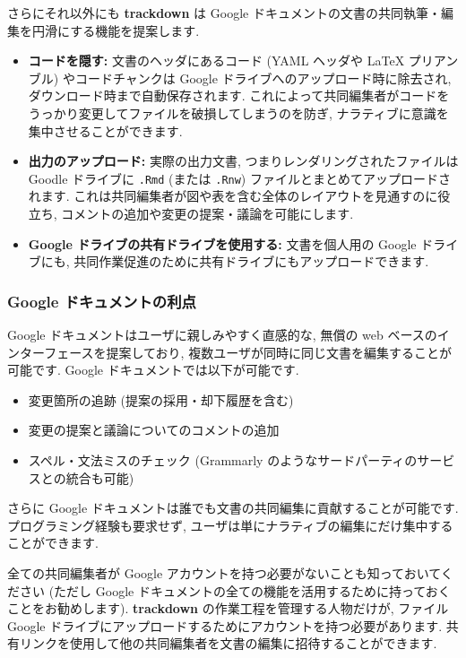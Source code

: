 \documentclass[
  11pt,
  lualatex,ja=standard,jafont=noto]{bxjsreport}
\providecommand{\tightlist}{%
  \setlength{\itemsep}{0pt}\setlength{\parskip}{0pt}}
\begin{document}
さらにそれ以外にも \textbf{trackdown} は Google ドキュメントの文書の共同執筆・編集を円滑にする機能を提案します.

\begin{itemize}
\item
  \textbf{コードを隠す:} 文書のヘッダにあるコード (YAML ヘッダや LaTeX プリアンブル) やコードチャンクは Google ドライブへのアップロード時に除去され, ダウンロード時まで自動保存されます. これによって共同編集者がコードをうっかり変更してファイルを破損してしまうのを防ぎ, ナラティブに意識を集中させることができます.
\item
  \textbf{出力のアップロード:} 実際の出力文書, つまりレンダリングされたファイルは Goodle ドライブに \texttt{.Rmd} (または \texttt{.Rnw}) ファイルとまとめてアップロードされます. これは共同編集者が図や表を含む全体のレイアウトを見通すのに役立ち, コメントの追加や変更の提案・議論を可能にします.
\item
  \textbf{Google ドライブの共有ドライブを使用する:} 文書を個人用の Google ドライブにも, 共同作業促進のために共有ドライブにもアップロードできます.
\end{itemize}

\hypertarget{google-ux30c9ux30adux30e5ux30e1ux30f3ux30c8ux306eux5229ux70b9}{%
\subsubsection*{Google ドキュメントの利点}\label{google-ux30c9ux30adux30e5ux30e1ux30f3ux30c8ux306eux5229ux70b9}}

Google ドキュメントはユーザに親しみやすく直感的な, 無償の web ベースのインターフェースを提案しており, 複数ユーザが同時に同じ文書を編集することが可能です. Google ドキュメントでは以下が可能です.

\begin{itemize}
\tightlist
\item
  変更箇所の追跡 (提案の採用・却下履歴を含む)
\item
  変更の提案と議論についてのコメントの追加
\item
  スペル・文法ミスのチェック (Grammarly のようなサードパーティのサービスとの統合も可能)
\end{itemize}

さらに Google ドキュメントは誰でも文書の共同編集に貢献することが可能です. プログラミング経験も要求せず, ユーザは単にナラティブの編集にだけ集中することができます.

全ての共同編集者が Google アカウントを持つ必要がないことも知っておいてください (ただし Google ドキュメントの全ての機能を活用するために持っておくことをお勧めします). \textbf{trackdown} の作業工程を管理する人物だけが, ファイル Google ドライブにアップロードするためにアカウントを持つ必要があります. 共有リンクを使用して他の共同編集者を文書の編集に招待することができます.
\end{document}

